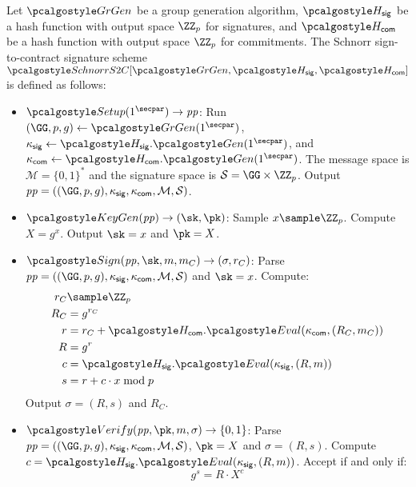 \begin{definition}\label{def:schnorr-s2c}
  Let $\grgen$ be a group generation algorithm, $\algo{H}_{\mathsf{sig}}$ be a hash function with output space $\ZZ_p$ for signatures, and $\algo{H}_{\mathsf{com}}$ be a hash function with output space $\ZZ_p$ for commitments. The Schnorr sign-to-contract signature scheme $\algo{SchnorrS2C}[\grgen, \algo{H}_{\mathsf{sig}}, \algo{H}_{\mathsf{com}}]$ is defined as follows:
  \begin{itemize}
    \item $\algo{Setup}(1^\secpar) \rightarrow \params$: Run $\gparam \gets \grgen(1^\secpar)$, $\kappa_{\mathsf{sig}} \gets \algo{H}_{\mathsf{sig}}.\algo{Gen}(1^\secpar)$, and $\kappa_{\mathsf{com}} \gets \algo{H}_{\mathsf{com}}.\algo{Gen}(1^\secpar)$. The message space is $\mathcal{M} = \{0,1\}^*$ and the signature space is $\mathcal{S} = \GG \times \ZZ_p$. Output $\params = (\gparam, \kappa_{\mathsf{sig}}, \kappa_{\mathsf{com}}, \mathcal{M}, \mathcal{S})$.
    
    \item $\algo{KeyGen}(\params) \rightarrow (\sk, \pk)$: Sample $x \sample \ZZ_p$. Compute $X = g^x$. Output $\sk = x$ and $\pk = X$.
    
    \item $\algo{Sign}(\params, \sk, m, m_C) \rightarrow (\sigma, r_C)$: Parse $\params = (\gparam, \kappa_{\mathsf{sig}}, \kappa_{\mathsf{com}}, \mathcal{M}, \mathcal{S})$ and $\sk = x$. Compute:
    \begin{align*}
      r_C &\sample \ZZ_p\\
      R_C &= g^{r_C} \\
      r &= r_C + \algo{H}_{\mathsf{com}}.\algo{Eval}(\kappa_{\mathsf{com}}, (R_C, m_C))\\
      R &= g^r \\
      c &= \algo{H}_{\mathsf{sig}}.\algo{Eval}(\kappa_{\mathsf{sig}}, (R, m)) \\
      s &= r + c \cdot x \bmod p
    \end{align*}
    Output $\sigma = (R, s)$ and $R_C$.
    
    \item $\algo{Verify}(\params, \pk, m, \sigma) \rightarrow \{0, 1\}$: Parse $\params = (\gparam, \kappa_{\mathsf{sig}}, \kappa_{\mathsf{com}}, \mathcal{M}, \mathcal{S})$, $\pk = X$ and $\sigma = (R, s)$. Compute $c = \algo{H}_{\mathsf{sig}}.\algo{Eval}(\kappa_{\mathsf{sig}}, (R, m))$. Accept if and only if:
    \[
      g^s = R \cdot X^c
    \]
  \end{itemize}
\end{definition}

